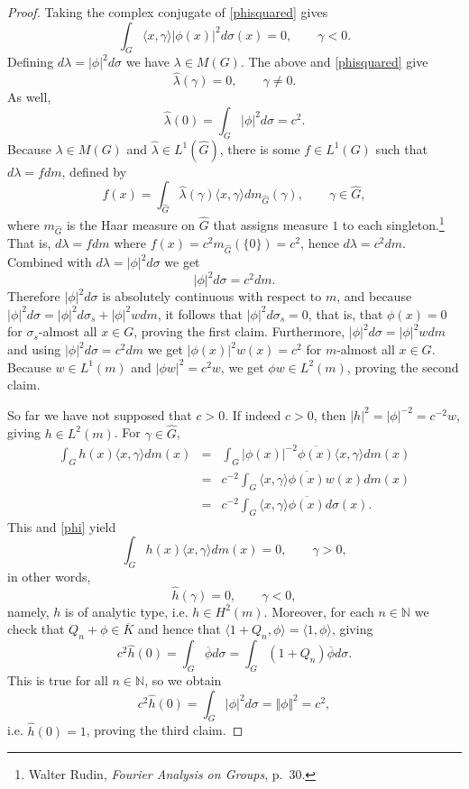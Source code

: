 \documentclass{article}
\newcommand{\inner}[2]{\langle #1, #2 \rangle}
\newcommand{\norm}[1]{\Vert #1 \Vert}
\begin{document}
\begin{proof}
Taking the complex conjugate of \eqref{phisquared} gives
\[
\int_G  \inner{x}{\gamma} |\phi(x)|^2  d\sigma(x)=0, \qquad \gamma<0.
\]
Defining $d\lambda = |\phi|^2 d\sigma$ we have $\lambda \in M(G)$.  The above and \eqref{phisquared} give 
\[
\hat{\lambda}(\gamma) = 0, \qquad \gamma \neq 0.
\]
As well,
\[
\hat{\lambda}(0) = \int_G |\phi|^2 d\sigma = c^2.
\]
Because $\lambda \in M(G)$ and $\hat{\lambda} \in L^1(\widehat{G})$, there is some $f \in L^1(G)$ such that $d\lambda = f dm$, defined by
\[
f(x) = \int_{\widehat{G}} \hat{\lambda}(\gamma) \inner{x}{\gamma} dm_{\widehat{G}}(\gamma), \qquad \gamma \in \widehat{G},
\]
where $m_{\widehat{G}}$ is the Haar measure on $\widehat{G}$ that assigns measure $1$ to each singleton.\footnote{Walter Rudin, {\em Fourier Analysis on Groups},
p.~30.}
That is, $d\lambda = fdm$ where
$f(x) = c^2 m_{\widehat{G}}(\{0\})=c^2$, hence
$d\lambda = c^2 dm$. Combined with $d\lambda = |\phi|^2 d\sigma$ we get
\[
|\phi|^2 d\sigma = c^2 dm.
\]
Therefore $|\phi|^2 d\sigma$ is absolutely continuous with respect to $m$, and because $|\phi|^2 d\sigma = |\phi|^2 d\sigma_s +
|\phi|^2 w dm$, it follows that $|\phi|^2 d\sigma_s=0$, that is, that $\phi(x)=0$ for $\sigma_s$-almost all $x \in G$, proving the first claim.
Furthermore, $|\phi|^2 d\sigma = |\phi|^2 w dm$ and using $|\phi|^2 d\sigma = c^2 dm$ we get 
$|\phi(x)|^2 w(x) = c^2$ for $m$-almost all $x \in G$. Because $w \in L^1(m)$ and $|\phi w|^2  = c^2 w$, we get
$\phi w \in L^2(m)$, proving the second claim.

So far we have not supposed that $c>0$. If indeed $c>0$, then $|h|^2 = |\phi|^{-2} = c^{-2} w$, giving $h \in L^2(m)$. For $\gamma \in
\widehat{G}$,
\begin{eqnarray*}
\int_G h(x) \inner{x}{\gamma} dm(x) &=& \int_G |\phi(x)|^{-2} \overline{\phi(x)} \inner{x}{\gamma} dm(x)\\
&=&c^{-2} \int_G  \inner{x}{\gamma} \overline{\phi(x)} w(x)   dm(x)\\
&=&c^{-2} \int_G\inner{x}{\gamma}  \overline{\phi(x)}  d\sigma(x).
\end{eqnarray*}
This and \eqref{phi}  yield
\[
\int_G h(x) \inner{x}{\gamma} dm(x) = 0, \qquad \gamma>0,
\]
in other words,
\[
\hat{h}(\gamma)=0, \qquad \gamma<0,
\]
namely, $h$ is of analytic type, i.e. $h \in H^2(m)$. 
Moreover, for each $n \in \mathbb{N}$ we check that $Q_n+\phi \in \overline{K}$ and hence
that $\inner{1+Q_n}{\phi}=\inner{1}{\phi}$, giving
\[
c^2 \hat{h}(0) = \int_G \overline{\phi} d\sigma= \int_G
(1+Q_n) \overline{\phi} d\sigma.
\]
This is true for all $n \in \mathbb{N}$, so we obtain 
\[
c^2 \hat{h}(0)= \int_G |\phi|^2 d\sigma = \norm{\phi}^2 = c^2,
\]
i.e. $\hat{h}(0)=1$, proving the third claim.
\end{proof}
\end{document}
